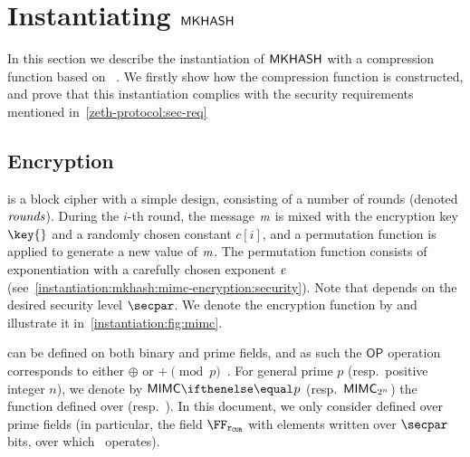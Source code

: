 
\section{Instantiating $\mathsf{MKHASH}$}\label{instantiation:mkhash}

In this section we describe the instantiation of $\mathsf{MKHASH}$ with a compression function based on \mimc{}~\cite{albrecht2016mimc}. We firstly show how the compression function is constructed, and prove that this instantiation complies with the security requirements mentioned in~\cref{zeth-protocol:sec-req}

\subsection{\mimc{} Encryption}\label{instantiation:mkhash:mimc-encryption}

\mimc{} is a block cipher with a simple design, consisting of a number of rounds (denoted $\mathit{rounds}$). During the $i$-th round, the message $\mathit{m}$ is mixed with the encryption key $\key{}$ and a randomly chosen constant $c[i]$, and a permutation function is applied to generate a new value of $\mathit{m}$. The permutation function consists of exponentiation with a carefully chosen exponent $\mathit{e}{}$ (see~\cref{instantiation:mkhash:mimc-encryption:security}). Note that \rounds{} depends on the desired security level $\secpar$. We denote the encryption function by \mimcEnc{} and illustrate it in~\cref{instantiation:fig:mimc}.

\begin{figure*}[ht]
    \centering
    \caption{\mimc{} Encryption function.}\label{instantiation:fig:mimc}
\end{figure*}

\mimcEnc{} can be defined on both binary and prime fields, and as such the $\mathsf{OP}$ operation corresponds to either $\oplus$ or $+ \pmod{p}$~\cite{albrecht2016mimc, grassi2016mpc}.
For general prime $p$ (resp.~positive integer $n$), we denote by $\mimcPrime{p}$ (resp.~$\mathsf{MIMC{}}_{2^n}$) the \mimcEnc{} function defined over  (resp.~). In this document, we only consider \mimc{} defined over prime fields (in particular, the field $\FFx{\rCURVE}$ with elements written over $\secpar$ bits, over which \zksnark~operates).

